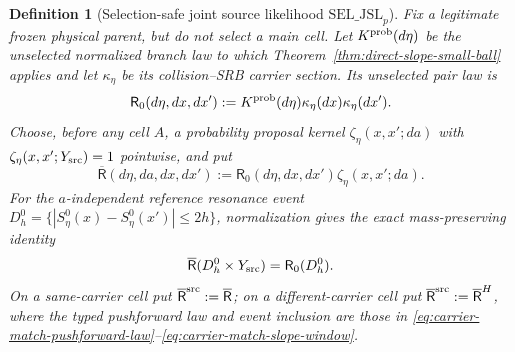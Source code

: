 \documentclass[11pt]{article}
\newtheorem{definition}[theorem]{Definition}
\begin{document}
\begin{definition}[Selection-safe joint source likelihood
$\mathrm{SEL\_JSL}_{p}$]
\label{def:joint-source-likelihood}
Fix a legitimate frozen physical parent, but do not select a main cell.
Let $K^{\rm prob}(d\eta)$ be the unselected normalized branch law to which
Theorem~\ref{thm:direct-slope-small-ball} applies and let
$\kappa_\eta$ be its collision--SRB carrier section.  Its unselected pair law
is
\begin{equation}
\label{eq:unselected-reference-law}
 \mathsf R_0(d\eta,dx,dx'):=K^{\rm prob}(d\eta)
 \kappa_\eta(dx)\kappa_\eta(dx').
\end{equation}
Choose, before any cell $A$, a probability proposal kernel
$\zeta_\eta(x,x';da)$ with
$\zeta_\eta(x,x';Y_{\rm src})=1$ pointwise, and put
\begin{equation}
\label{eq:proposal-lift}
 \overline{\mathsf R}(d\eta,da,dx,dx')
 :=\mathsf R_0(d\eta,dx,dx')\zeta_\eta(x,x';da).
\end{equation}
For the $a$-independent reference resonance event
$D_h^0=\{|S_\eta^0(x)-S_\eta^0(x')|\le2h\}$, normalization gives the exact
mass-preserving identity
\begin{equation}
\label{eq:proposal-preserves-reference-energy}
\overline{\mathsf R}(D_h^0\times Y_{\rm src})=\mathsf R_0(D_h^0).
\end{equation}
On a same-carrier cell put
$\overline{\mathsf R}^{\rm src}:=\overline{\mathsf R}$; on a
different-carrier cell put
$\overline{\mathsf R}^{\rm src}:=\overline{\mathsf R}^{H}$, where the typed
pushforward law and event inclusion are those in
\eqref{eq:carrier-match-pushforward-law}--\eqref{eq:carrier-match-slope-window}.


\end{definition}
\end{document}
